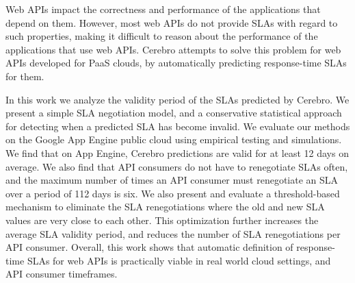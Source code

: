 Web APIs impact the correctness and performance of the applications that depend on them.
However, most web APIs do not provide SLAs with regard to such properties, making it
difficult to reason about the performance of the applications that use web APIs. Cerebro attempts
to solve this problem for web APIs developed for PaaS clouds, by automatically predicting
response-time SLAs for them. 

In this work we analyze the validity period of the SLAs predicted by Cerebro. We present a simple
SLA negotiation model, and a conservative statistical approach for detecting when a predicted SLA has become
invalid. We evaluate our methods on the Google App Engine public cloud using empirical testing
and simulations. We find that on App Engine, Cerebro predictions are valid for at least 12 days
on average. We also find that API consumers do not have to renegotiate SLAs often, and the maximum
number of times an API consumer must renegotiate an SLA over a period of 112 days is six. We
also present and evaluate a threshold-based mechanism to eliminate the SLA renegotiations where
the old and new SLA values are very close to each other. This optimization further increases
the average SLA validity period, and reduces the number of SLA renegotiations per API consumer.
Overall, this work shows that automatic definition of response-time SLAs for web APIs is practically
viable in real world cloud settings, and API consumer timeframes. 
